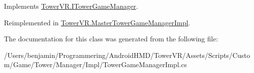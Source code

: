 Implements \hyperlink{interface_tower_v_r_1_1_i_tower_game_manager_a3b5866dd2b9659d65982f4ff651ee2c9}{Tower\+V\+R.\+I\+Tower\+Game\+Manager}.



Reimplemented in \hyperlink{class_tower_v_r_1_1_master_tower_game_manager_impl_a43cb29dc14b7d9dcd90b5826c49a380d}{Tower\+V\+R.\+Master\+Tower\+Game\+Manager\+Impl}.



The documentation for this class was generated from the following file\+:\begin{DoxyCompactItemize}
\item 
/\+Users/benjamin/\+Programmering/\+Android\+H\+M\+D/\+Tower\+V\+R/\+Assets/\+Scripts/\+Custom/\+Game/\+Tower/\+Manager/\+Impl/Tower\+Game\+Manager\+Impl.\+cs\end{DoxyCompactItemize}
